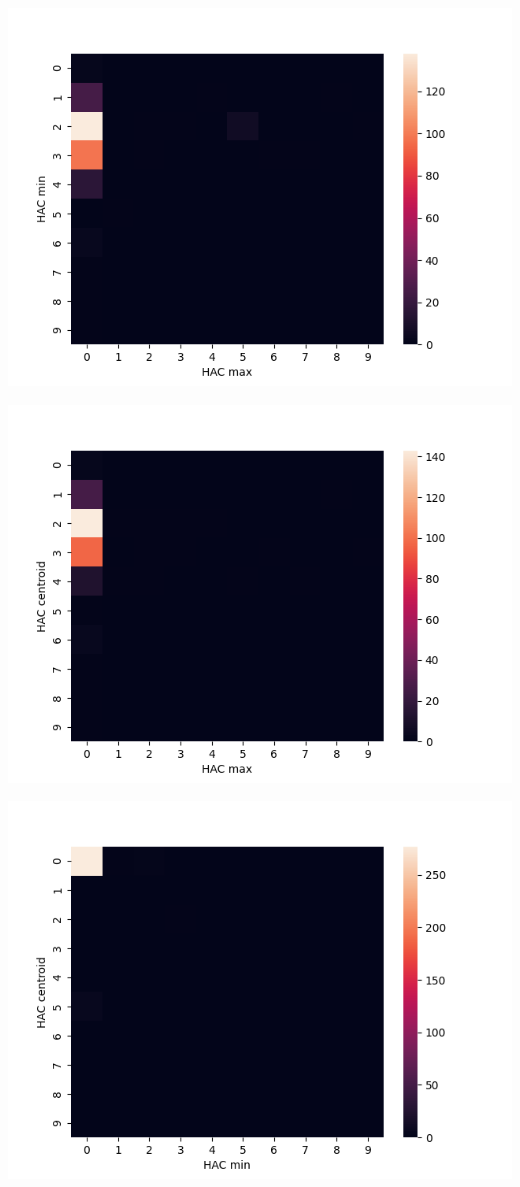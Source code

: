 \documentclass[submit]{harvardml}
\begin{document}
\begin{center}
    \includegraphics[scale=0.5]{HW4/2.6.4.png}
\end{center}
\begin{center}
    \includegraphics[scale=0.5]{HW4/2.6.5.png}
\end{center}
\begin{center}
    \includegraphics[scale=0.5]{HW4/2.6.6.png}
\end{center}
\end{document}
